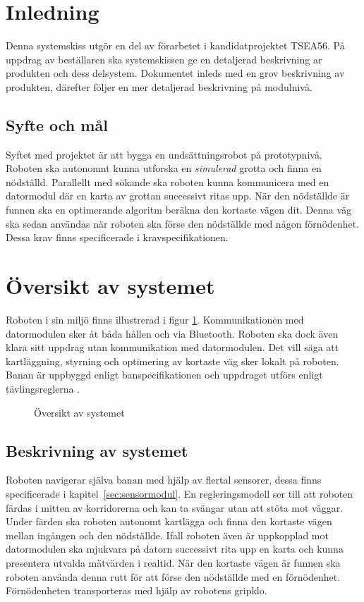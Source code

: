 \documentclass[11pt]{article}
\begin{document}
\begin{flushleft}

\section{Inledning}
Denna systemskiss utgör en del av förarbetet i kandidatprojektet TSEA56. På uppdrag av beställaren ska systemskissen ge en detaljerad beskrivning ar produkten och dess delsystem. Dokumentet inleds med en grov beskrivning av produkten, därefter följer en mer detaljerad beskrivning på modulnivå.
\subsection{Syfte och mål}
Syftet med projektet är att bygga en undsättningsrobot på prototypnivå. Roboten ska autonomnt kunna utforska en \textit{simulerad} grotta och finna en nödställd. Parallellt med sökande ska roboten kunna kommunicera med en datormodul där en karta av grottan successivt ritas upp. När den nödställde är funnen ska en optimerande algoritm beräkna den kortaste vägen dit. Denna väg ska sedan användas när roboten ska förse den nödställde med någon förnödenhet. Dessa krav finns specificerade i kravspecifikationen.\cite{krav}

\pagebreak
\section{Översikt av systemet}
Roboten i sin miljö finns illustrerad i figur \ref{system}. Kommunikationen med datormodulen sker åt båda hållen och via Bluetooth\textsuperscript{\circledR}. Roboten ska dock även klara sitt uppdrag utan kommunikation med datormodulen. Det vill säga att kartläggning, styrning och optimering av kortaste väg sker lokalt på roboten. Banan är uppbyggd enligt banspecifikationen \cite{banspec} och uppdraget utförs enligt tävlingsreglerna \cite{tavling}.
\begin{figure}[htbp]
\centering
\noindent\resizebox{.8\linewidth}{!}{
	}
	\caption{Översikt av systemet \label{system}}	
\end{figure}


\subsection{Beskrivning av systemet}
Roboten navigerar själva banan med hjälp av flertal sensorer, dessa finns specificerade i \mbox{kapitel \ref{sec:sensormodul}}. En regleringsmodell ser till att roboten färdas i mitten av korridorerna och kan ta svängar utan att stöta mot väggar. Under färden ska roboten autonomt kartlägga och finna den kortaste vägen mellan ingången och den nödställde. Ifall roboten även är uppkopplad mot datormodulen ska mjukvara på datorn successivt rita upp en karta och kunna presentera utvalda mätvärden i realtid. När den kortaste vägen är funnen ska roboten använda denna rutt för att förse den nödställde med en förnödenhet. Förnödenheten transporteras med hjälp av robotens gripklo.


\end{flushleft}
\end{document}
